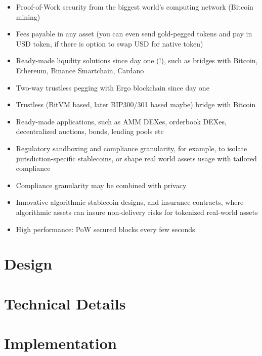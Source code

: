 \documentclass{llncs}   %
\begin{document}
\begin{itemize}
  \item Proof-of-Work security from the biggest world's computing network (Bitcoin mining)
  \item Fees payable in any asset (you can even send gold-pegged tokens and pay in USD token, if there is option to swap USD for native token)
  \item Ready-made liqudity solutions since day one (!), such as bridges with Bitcoin, Ethereum, Binance Smartchain, Cardano
  \item Two-way trustless pegging with Ergo blockchain since day one
  \item Trustless (BitVM based, later BIP300/301 based maybe) bridge with Bitcoin
  \item Ready-made applications, such as AMM DEXes, orderbook DEXes, decentralized auctions, bonds, lending pools etc
  \item Regulatory sandboxing and compliance granularity, for example, to isolate jurisdiction-specific stablecoins, or shape real world assets usage with tailored compliance
  \item Compliance granularity may be combined with privacy
  \item Innovative algorithmic stablecoin designs, and insurance contracts, where algorithmic assets can insure non-delivery risks for tokenized real-world assets
  \item High performance: PoW secured blocks every few seconds
\end{itemize}



\section{Design}
\label{sec-design}




\section{Technical Details}
\label{sec-impl}


\section{Implementation}
\label{sec-apps}



\newpage

 
\end{document}
